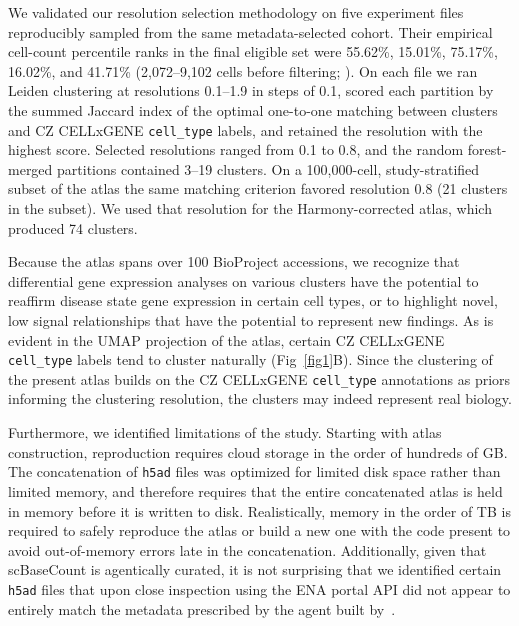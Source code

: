\documentclass[10pt,letterpaper]{article}
\begin{document}
We validated our resolution selection methodology on five experiment files reproducibly sampled from the same metadata-selected cohort. Their empirical cell-count percentile ranks in the final eligible set were 55.62\%, 15.01\%, 75.17\%, 16.02\%, and 41.71\% (2,072--9,102 cells before filtering; ). On each file we ran Leiden clustering at resolutions 0.1--1.9 in steps of 0.1, scored each partition by the summed Jaccard index of the optimal one-to-one matching between clusters and CZ CELLxGENE \texttt{cell_type} labels, and retained the resolution with the highest score. Selected resolutions ranged from 0.1 to 0.8, and the random forest-merged partitions contained 3--19 clusters. On a 100,000-cell, study-stratified subset of the atlas the same matching criterion favored resolution 0.8 (21 clusters in the subset). We used that resolution for the Harmony-corrected atlas, which produced 74 clusters.

Because the atlas spans over 100 BioProject accessions, we recognize that differential gene expression analyses on various clusters have the potential to reaffirm disease state gene expression in certain cell types, or to highlight novel, low signal relationships that have the potential to represent new findings. As is evident in the UMAP projection of the atlas, certain CZ CELLxGENE \texttt{cell_type} labels tend to cluster naturally (Fig~\ref{fig1}B). Since the clustering of the present atlas builds on the CZ CELLxGENE \texttt{cell_type} annotations as priors informing the clustering resolution, the clusters may indeed represent real biology.

Furthermore, we identified limitations of the study. Starting with atlas construction, reproduction requires cloud storage in the order of hundreds of GB. The concatenation of \texttt{h5ad} files was optimized for limited disk space rather than limited memory, and therefore requires that the entire concatenated atlas is held in memory before it is written to disk. Realistically, memory in the order of TB is required to safely reproduce the atlas or build a new one with the code present to avoid out-of-memory errors late in the concatenation. Additionally, given that scBaseCount is agentically curated, it is not surprising that we identified certain \texttt{h5ad} files that upon close inspection using the ENA portal API did not appear to entirely match the metadata prescribed by the agent built by~\textcite{youngblutScBaseCountAIAgentcurated2025}.
\end{document}
